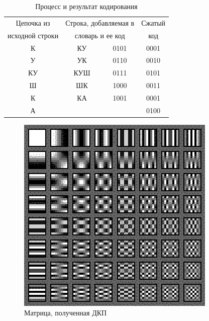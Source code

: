 \begin{table}[H]
\begin{center}
	\begin{tabular}{|c|c|c|c|}
		\hline	
		  Цепочка из & \multicolumn{2}{|c|}{Строка, добавляемая в} & Сжатый \\
		  исходной строки & \multicolumn{2}{|c|}{словарь и ее код} & код \\
		\hline
	  	  К    & КУ & 0101 & 0001 \\
		\hline
		  У	   & УК & 0110 & 0010 \\
		\hline  
		  КУ   & КУШ & 0111 & 0101 \\
		\hline  	
		  Ш    & ШК & 1000 & 0011 \\
		\hline
		  К    & КА & 1001 & 0001 \\
		\hline
		  А    &    &      & 0100 \\
		\hline
	\end{tabular}
	\caption{Процесс и результат кодирования}
	\label{table:lzw:result}
\end{center}
\end{table}

\begin{figure}[H]
	\begin{center}
		\includegraphics[scale=1]{../pics/cosine_transform/matrix.png}
		\caption{Матрица, полученная ДКП}
		\label{pic:cosine_tranform:matrix}
	\end{center}
\end{figure}




